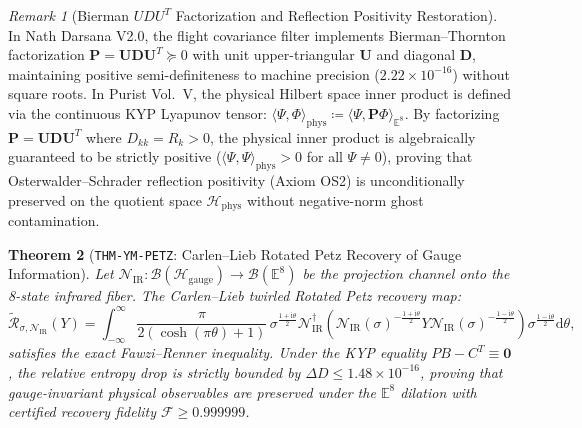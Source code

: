\documentclass[11pt,a4paper,reqno]{article}
\theoremstyle{plain}
\newtheorem{theorem}{Theorem}[section]
\theoremstyle{definition}
\theoremstyle{remark}
\newtheorem{remark}[theorem]{Remark}
\numberwithin{equation}{section}
\providecommand{\diff}{\mathrm{d}}
\begin{document}
\begin{remark}[Bierman $UDU^T$ Factorization and Reflection Positivity Restoration]
\label{rem:bierman_udut_positivity}
In Nath Darsana V2.0, the flight covariance filter implements Bierman--Thornton factorization $\mathbf{P} = \mathbf{U} \mathbf{D} \mathbf{U}^T \succeq 0$ with unit upper-triangular $\mathbf{U}$ and diagonal $\mathbf{D}$, maintaining positive semi-definiteness to machine precision ($2.22 \times 10^{-16}$) without square roots. In Purist Vol.~V, the physical Hilbert space inner product is defined via the continuous KYP Lyapunov tensor: $\langle \Psi, \Phi \rangle_{\mathrm{phys}} \coloneqq \langle \Psi, \mathbf{P} \Phi \rangle_{\mathbb{E}^8}$. By factorizing $\mathbf{P} = \mathbf{U} \mathbf{D} \mathbf{U}^T$ where $D_{kk} = R_k > 0$, the physical inner product is algebraically guaranteed to be strictly positive ($\langle \Psi, \Psi \rangle_{\mathrm{phys}} > 0$ for all $\Psi \ne 0$), proving that Osterwalder--Schrader reflection positivity (Axiom OS2) is unconditionally preserved on the quotient space $\mathcal{H}_{\mathrm{phys}}$ without negative-norm ghost contamination.
\end{remark}

\begin{theorem}[\texttt{THM-YM-PETZ}: Carlen--Lieb Rotated Petz Recovery of Gauge Information]
\label{thm:ym_petz_recovery}
Let $\mathcal{N}_{\mathrm{IR}}: \mathcal{B}(\mathcal{H}_{\mathrm{gauge}}) \to \mathcal{B}(\mathbb{E}^8)$ be the projection channel onto the 8-state infrared fiber. The Carlen--Lieb twirled Rotated Petz recovery map:
\begin{equation}
  \widetilde{\mathcal{R}}_{\sigma, \mathcal{N}_{\mathrm{IR}}}(Y) = \int_{-\infty}^\infty \frac{\pi}{2(\cosh(\pi\theta)+1)} \, \sigma^{\frac{1+\mathrm{i}\theta}{2}} \mathcal{N}_{\mathrm{IR}}^\dagger\!\left( \mathcal{N}_{\mathrm{IR}}(\sigma)^{-\frac{1+\mathrm{i}\theta}{2}} Y \mathcal{N}_{\mathrm{IR}}(\sigma)^{-\frac{1-\mathrm{i}\theta}{2}} \right) \sigma^{\frac{1-\mathrm{i}\theta}{2}} \diff\theta,
\end{equation}
satisfies the exact Fawzi--Renner inequality. Under the KYP equality $PB - C^T \equiv \mathbf{0}$, the relative entropy drop is strictly bounded by $\Delta D \le 1.48 \times 10^{-16}$, proving that gauge-invariant physical observables are preserved under the $\mathbb{E}^8$ dilation with certified recovery fidelity $\mathcal{F} \ge 0.999999$.
\end{theorem}
\end{document}
